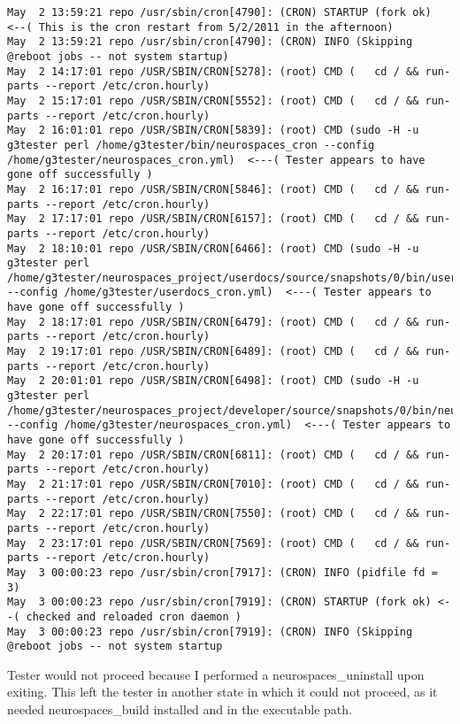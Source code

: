 \documentclass[12pt]{article}
\begin{document}
\begin{itemize}
\begin{itemize}
  \begin{verbatim}
May  2 13:59:21 repo /usr/sbin/cron[4790]: (CRON) STARTUP (fork ok)        <--( This is the cron restart from 5/2/2011 in the afternoon)
May  2 13:59:21 repo /usr/sbin/cron[4790]: (CRON) INFO (Skipping @reboot jobs -- not system startup)
May  2 14:17:01 repo /USR/SBIN/CRON[5278]: (root) CMD (   cd / && run-parts --report /etc/cron.hourly)
May  2 15:17:01 repo /USR/SBIN/CRON[5552]: (root) CMD (   cd / && run-parts --report /etc/cron.hourly)
May  2 16:01:01 repo /USR/SBIN/CRON[5839]: (root) CMD (sudo -H -u g3tester perl /home/g3tester/bin/neurospaces_cron --config /home/g3tester/neurospaces_cron.yml)  <---( Tester appears to have gone off successfully )
May  2 16:17:01 repo /USR/SBIN/CRON[5846]: (root) CMD (   cd / && run-parts --report /etc/cron.hourly)
May  2 17:17:01 repo /USR/SBIN/CRON[6157]: (root) CMD (   cd / && run-parts --report /etc/cron.hourly)
May  2 18:10:01 repo /USR/SBIN/CRON[6466]: (root) CMD (sudo -H -u g3tester perl /home/g3tester/neurospaces_project/userdocs/source/snapshots/0/bin/userdocs_cron --config /home/g3tester/userdocs_cron.yml)  <---( Tester appears to have gone off successfully )
May  2 18:17:01 repo /USR/SBIN/CRON[6479]: (root) CMD (   cd / && run-parts --report /etc/cron.hourly)
May  2 19:17:01 repo /USR/SBIN/CRON[6489]: (root) CMD (   cd / && run-parts --report /etc/cron.hourly)
May  2 20:01:01 repo /USR/SBIN/CRON[6498]: (root) CMD (sudo -H -u g3tester perl /home/g3tester/neurospaces_project/developer/source/snapshots/0/bin/neurospaces_cron --config /home/g3tester/neurospaces_cron.yml)  <---( Tester appears to have gone off successfully )
May  2 20:17:01 repo /USR/SBIN/CRON[6811]: (root) CMD (   cd / && run-parts --report /etc/cron.hourly)
May  2 21:17:01 repo /USR/SBIN/CRON[7010]: (root) CMD (   cd / && run-parts --report /etc/cron.hourly)
May  2 22:17:01 repo /USR/SBIN/CRON[7550]: (root) CMD (   cd / && run-parts --report /etc/cron.hourly)
May  2 23:17:01 repo /USR/SBIN/CRON[7569]: (root) CMD (   cd / && run-parts --report /etc/cron.hourly)
May  3 00:00:23 repo /usr/sbin/cron[7917]: (CRON) INFO (pidfile fd = 3)
May  3 00:00:23 repo /usr/sbin/cron[7919]: (CRON) STARTUP (fork ok) <--( checked and reloaded cron daemon )
May  3 00:00:23 repo /usr/sbin/cron[7919]: (CRON) INFO (Skipping @reboot jobs -- not system startup
  \end{verbatim}
 
    Tester would not proceed because I performed a
    neurospaces\_uninstall upon exiting. This left the tester in
    another state in which it could not proceed, as it needed
    neurospaces\_build installed and in the executable path.
 

\end{itemize}
\end{itemize}
\end{document}
